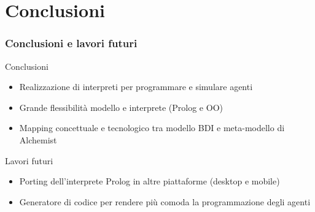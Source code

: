 \documentclass[handout]{beamer}\mode<presentation>{\usetheme{AMSCesenaBleu}}
\begin{document}
\section{Conclusioni}

\begin{frame}
\frametitle{Conclusioni e lavori futuri}
\begin{block}{Conclusioni}
\begin{itemize}
\item Realizzazione di interpreti per programmare e simulare agenti
\item Grande flessibilità modello e interprete (Prolog e OO)
\item Mapping concettuale e tecnologico tra modello BDI e meta-modello di Alchemist
\end{itemize}
\end{block}
\begin{block}{Lavori futuri}
\begin{itemize}
\item Porting dell'interprete Prolog in altre piattaforme (desktop e mobile)
\item Generatore di codice per rendere più comoda la programmazione degli agenti
\end{itemize}
\end{block}
\end{frame}

\section{}
\subsection{}
\maketitle
\end{document}
